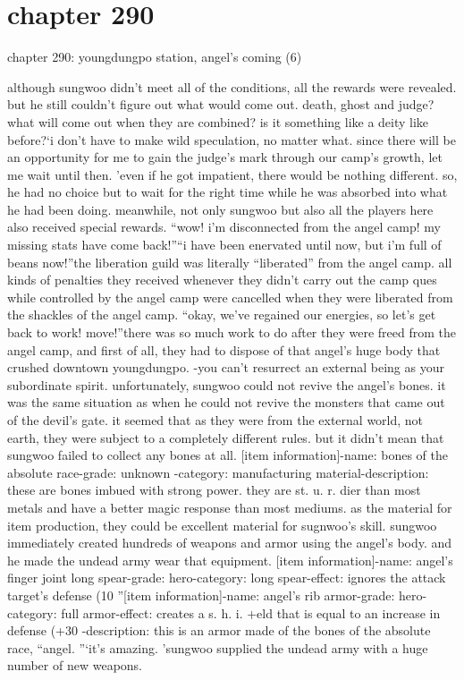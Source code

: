 \section{chapter 290}

chapter 290: youngdungpo station, angel's coming (6)




although sungwoo didn't meet all of the conditions, all the rewards were revealed.
but he still couldn't figure out what would come out.
death, ghost and judge? what will come out when they are combined? is it something like a deity like before?‘i don't have to make wild speculation, no matter what.
 since there will be an opportunity for me to gain the judge's mark through our camp's growth, let me wait until then.
'even if he got impatient, there would be nothing different.
 so, he had no choice but to wait for the right time while he was absorbed into what he had been doing.
meanwhile, not only sungwoo but also all the players here also received special rewards.
“wow! i'm disconnected from the angel camp! my missing stats have come back!”“i have been enervated until now, but i'm full of beans now!”the liberation guild was literally “liberated” from the angel camp.
 all kinds of penalties they received whenever they didn't carry out the camp ques while controlled by the angel camp were cancelled when they were liberated from the shackles of the angel camp.
“okay, we've regained our energies, so let's get back to work! move!”there was so much work to do after they were freed from the angel camp, and first of all, they had to dispose of that angel's huge body that crushed downtown youngdungpo.
-you can't resurrect an external being as your subordinate spirit.
unfortunately, sungwoo could not revive the angel's bones.
 it was the same situation as when he could not revive the monsters that came out of the devil's gate.
it seemed that as they were from the external world, not earth, they were subject to a completely different rules.
but it didn't mean that sungwoo failed to collect any bones at all.
[item information]-name: bones of the absolute race-grade: unknown
-category: manufacturing material-description: these are bones imbued with strong power.
 they are st.
u.
r.
dier than most metals and have a better magic response than most mediums.
as the material for item production, they could be excellent material for sugnwoo's skill.
sungwoo immediately created hundreds of weapons and armor using the angel's body.
and he made the undead army wear that equipment.
[item information]-name: angel's finger joint long spear-grade: hero-category: long spear-effect: ignores the attack target's defense (10%
”[item information]-name: angel's rib armor-grade: hero-category: full armor-effect: creates a s.
h.
i.
+eld that is equal to an increase in defense (+30%
-description: this is an armor made of the bones of the absolute race, “angel.
”‘it's amazing.
'sungwoo supplied the undead army with a huge number of new weapons.

